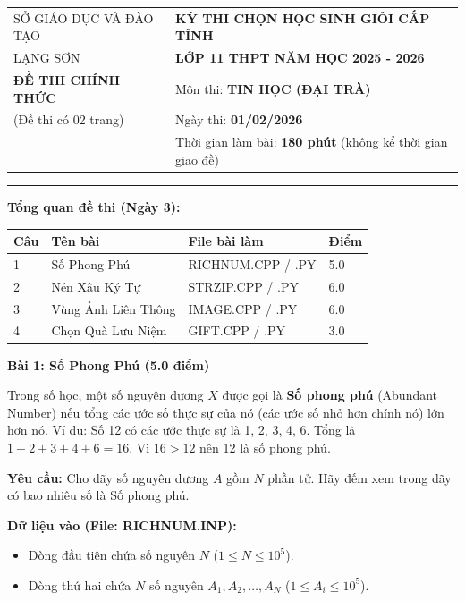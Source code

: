 \documentclass[11pt, a4paper]{article}
\newcommand{\bai}[2]{\vspace{0.5cm}\noindent\textbf{Bài #1: #2}}
\begin{document}
\begin{center}
    \begin{tabular}{>{\centering\arraybackslash}p{} >{\centering\arraybackslash}p{}}
        SỞ GIÁO DỤC VÀ ĐÀO TẠO & \textbf{KỲ THI CHỌN HỌC SINH GIỎI CẤP TỈNH} \\
        LẠNG SƠN & \textbf{LỚP 11 THPT NĂM HỌC 2025 - 2026} \\
        \textbf{ĐỀ THI CHÍNH THỨC} & Môn thi: \textbf{TIN HỌC (ĐẠI TRÀ)} \\
        (Đề thi có 02 trang) & Ngày thi: \textbf{01/02/2026} \\
         & Thời gian làm bài: \textbf{180 phút} (không kể thời gian giao đề)
    \end{tabular}
\end{center}
\hrule
\vspace{0.5cm}

\textbf{Tổng quan đề thi (Ngày 3):}
\begin{center}
\begin{tabular}{|l|l|l|l|}
\hline
\textbf{Câu} & \textbf{Tên bài} & \textbf{File bài làm} & \textbf{Điểm} \\ \hline
1 & Số Phong Phú & RICHNUM.CPP / .PY & 5.0 \\ \hline
2 & Nén Xâu Ký Tự & STRZIP.CPP / .PY & 6.0 \\ \hline
3 & Vùng Ảnh Liên Thông & IMAGE.CPP / .PY & 6.0 \\ \hline
4 & Chọn Quà Lưu Niệm & GIFT.CPP / .PY & 3.0 \\ \hline
\end{tabular}
\end{center}

\vspace{0.5cm}

\bai{1}{Số Phong Phú (5.0 điểm)}

Trong số học, một số nguyên dương $X$ được gọi là \textbf{Số phong phú} (Abundant Number) nếu tổng các ước số thực sự của nó (các ước số nhỏ hơn chính nó) lớn hơn nó.
Ví dụ: Số 12 có các ước thực sự là 1, 2, 3, 4, 6. Tổng là $1+2+3+4+6 = 16$. Vì $16 > 12$ nên 12 là số phong phú.

\textbf{Yêu cầu:} Cho dãy số nguyên dương $A$ gồm $N$ phần tử. Hãy đếm xem trong dãy có bao nhiêu số là Số phong phú.

\textbf{Dữ liệu vào (File: RICHNUM.INP):}
\begin{itemize}
    \item Dòng đầu tiên chứa số nguyên $N$ ($1 \le N \le 10^5$).
    \item Dòng thứ hai chứa $N$ số nguyên $A_1, A_2, \dots, A_N$ ($1 \le A_i \le 10^5$).
\end{itemize}
\end{document}
